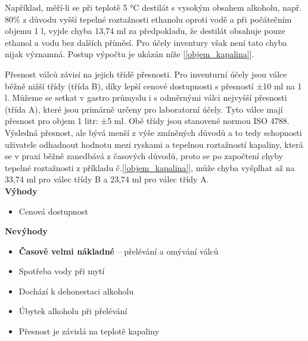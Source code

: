 Například, měří-li se při teplotě 5 °C destilát s vysokým obsahem alkoholu, např. 80\% z důvodu vyšší 
tepelné roztažnosti ethanolu oproti vodě a při počátečním objemu 1 l, vyjde chyba 13,74 ml za předpokladu, že destilát obsahuje pouze ethanol a vodu bez dalších příměsí. Pro účely inventury však není tato chyba nijak významná.
Postup výpočtu je ukázán níže [\ref{objem_kapalina}].
          
Přesnost válců závisí na jejich třídě přesnosti. Pro inventurní účely jsou válce běžně nižší třídy (třída B), díky lepší cenové dostupnosti s přesností ±10 ml na 1 l. Můžeme se setkat v gastro průmyslu i s odměrnými válci nejvyšší přesnosti (třída A), které jsou primárně určeny pro laboratorní účely. Tyto válce mají přesnost pro objem 1 litr: ±5 ml. Obě třídy jsou stanovené normou ISO 4788. Výsledná přesnost, ale bývá menší z výše zmíněných důvodů a to tedy schopnosti uživatele odhadnout hodnotu mezi ryskami a tepelnou roztažností kapaliny, která se v praxi běžně zanedbává z časových důvodů, proto se po započtení chyby tepelné roztažnosti z příkladu č.[\ref{objem_kapalina}], může chyba vyšplhat až na 33,74 ml pro válec třídy B a 23,74 ml pro válec třídy A.\\



\textbf{Výhody}
\begin{itemize}
    \item Cenová dostupnost\\
\end{itemize}

\textbf{Nevýhody}
\begin{itemize}
    \item \textbf{Časově velmi nákladné} – přelévání a omývání válců
    \item Spotřeba vody při mytí
    \item Dochází k dehonestaci alkoholu
    \item Úbytek alkoholu při přelévání
    \item Přesnost je závislá na teplotě kapaliny
\end{itemize}

